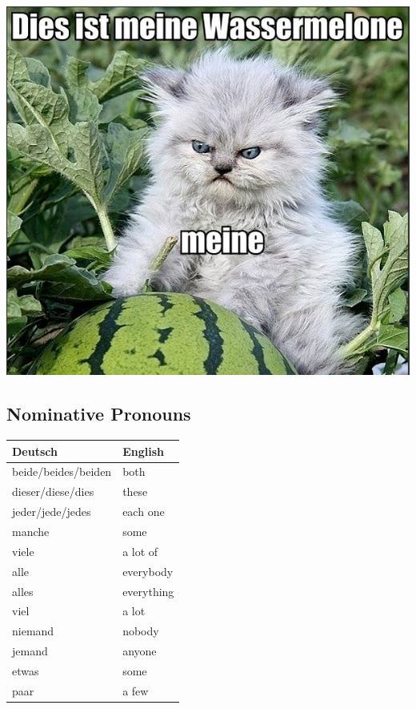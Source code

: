 \begin{center}
  \includegraphics[bb=0 0 640 480]{images/Wassermelone.jpg}
\end{center}


\pagebreak
\subsection{Nominative Pronouns}

\begin{center}\begin{tabular}{l|l}
  \textbf{Deutsch} & \textbf{English} \\
	\hline
	beide/beides/beiden & both \\
	dieser/diese/dies & these \\
	jeder/jede/jedes & each one \\
	manche & some \\
	viele & a lot of \\
	alle & everybody \\
	alles & everything \\
	viel & a lot \\
	niemand & nobody \\
	jemand & anyone \\
	etwas & some \\
	paar & a few \\
\end{tabular}\end{center}

